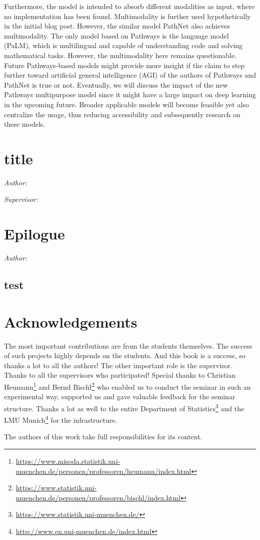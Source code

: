 \documentclass[
]{krantz}
\renewcommand{\href}[2]{#2\footnote{\url{#1}}}
\begin{document}
Furthermore, the model is intended to absorb different modalities as input, where no implementation has been found. Multimodality is further used hypothetically in the initial blog post. However, the similar model PathNet also achieves multimodality. The only model based on Pathways is the language model (PaLM), which is multilingual and capable of understanding code and solving mathematical tasks. However, the multimodality here remains questionable. Future Pathways-based models might provide more insight if the claim to step further toward artificial general intelligence (AGI) of the authors of Pathways and PathNet is true or not. Eventually, we will discuss the impact of the new Pathways multipurpose model since it might have a large impact on deep learning in the upcoming future. Broader applicable models will become feasible yet also centralize the usage, thus reducing accessibility and subsequently research on these models.

\hypertarget{title-8}{%
\chapter{title}\label{title-8}}

\emph{Author: }

\emph{Supervisor: }

\hypertarget{epilogue}{%
\chapter{Epilogue}\label{epilogue}}

\emph{Author: }

\hypertarget{test}{%
\section{test}\label{test}}

\hypertarget{acknowledgements}{%
\chapter{Acknowledgements}\label{acknowledgements}}

The most important contributions are from the students themselves.
The success of such projects highly depends on the students.
And this book is a success, so thanks a lot to all the authors!
The other important role is the supervisor.
Thanks to all the supervisors who participated!
Special thanks to \href{https://www.misoda.statistik.uni-muenchen.de/personen/professoren/heumann/index.html}{Christian Heumann} and \href{https://www.statistik.uni-muenchen.de/personen/professoren/bischl/index.html}{Bernd Bischl} who enabled us to conduct the seminar in such an experimental way, supported us and gave valuable feedback for the seminar structure.
Thanks a lot as well to the entire \href{https://www.statistik.uni-muenchen.de/}{Department of Statistics} and the \href{http://www.en.uni-muenchen.de/index.html}{LMU Munich} for the infrastructure.

The authors of this work take full responsibilities for its content.

  

\backmatter
\printindex
\end{document}
